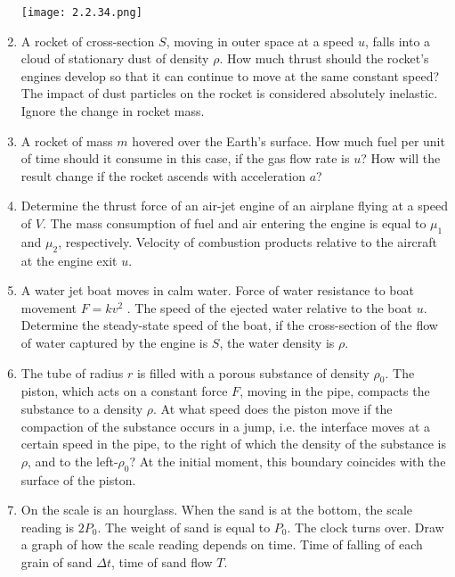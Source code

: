 \documentclass{article}
\begin{document}
\begin{enumerate}[label=2.2.\arabic*]
\begin{center}
    \texttt{[image: 2.2.34.png]}
\end{center}

\item A rocket of cross-section $S$, moving in outer space at a speed $u$, falls into a cloud of stationary dust of density $\rho$. How much thrust should the rocket's engines develop so that it can continue to move at the same constant speed? The impact of dust particles on the rocket is considered absolutely inelastic. Ignore the change in rocket mass.

\item A rocket of mass $m$ hovered over the Earth's surface. How much fuel per unit of time should it consume in this case, if the gas flow rate is $u$? How will the result change if the rocket ascends with acceleration $a$?

\item Determine the thrust force of an air-jet engine of an airplane flying at a speed of $V$. The mass consumption of fuel and air entering the engine is equal to $\mu_1$ and $\mu_2$, respectively. Velocity of combustion products relative to the aircraft at the engine exit $u$.

\item A water jet boat moves in calm water. Force of water resistance to boat movement $F = k v^2$ . The speed of the ejected water relative to the boat $u$. Determine the steady-state speed of the boat, if the cross-section of the flow of water captured by the engine is $S$, the water density is $\rho$.

\item The tube of radius $r$ is filled with a porous substance of density $\rho_0$. The piston, which acts on a constant force $F$, moving in the pipe, compacts the substance to a density $\rho$. At what speed does the piston move if the compaction of the substance occurs in a jump, i.e. the interface moves at a certain speed in the pipe, to the right of which the density of the substance is $\rho$, and to the left-$\rho_0$? At the initial moment, this boundary coincides with the surface of the piston.

\item On the scale is an hourglass. When the sand is at the bottom, the scale reading is $2P_0$. The weight of sand is equal to $P_0$. The clock turns over. Draw a graph of how the scale reading depends on time. Time of falling of each grain of sand $\Delta t$, time of sand flow $T$.


\end{enumerate}
\end{document}
